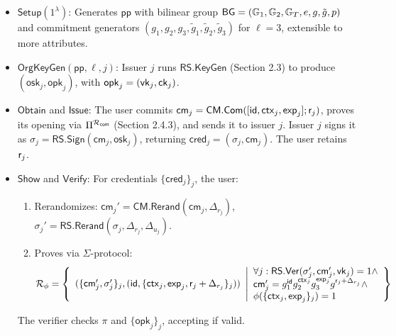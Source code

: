 \begin{itemize}
    \item $\mathsf{Setup}(1^\lambda)$: Generates $\mathsf{pp}$ with bilinear group $\mathsf{BG} = (\mathbb{G}_1, \mathbb{G}_2, \mathbb{G}_T, e, g, \tilde{g}, p)$ and commitment generators $(g_1, g_2, g_3, \tilde{g}_1, \tilde{g}_2, \tilde{g}_3)$ for $\ell = 3$, extensible to more attributes.
    
    \item $\mathsf{OrgKeyGen}(\mathsf{pp}, \ell, j)$: Issuer $j$ runs $\mathsf{RS.KeyGen}$ (Section 2.3) to produce $(\mathsf{osk}_j, \mathsf{opk}_j)$, with $\mathsf{opk}_j = (\mathsf{vk}_j, \mathsf{ck}_j)$.

    \item $\mathsf{Obtain}$ and $\mathsf{Issue}$: The user commits $\mathsf{cm}_j = \mathsf{CM.Com}([\mathsf{id}, \mathsf{ctx}_j, \mathsf{exp}_j]; \mathsf{r}_j)$, proves its opening via $\Pi^{\mathcal{R}_{\mathsf{com}}}$ (Section 2.4.3), and sends it to issuer $j$. Issuer $j$ signs it as $\sigma_j = \mathsf{RS.Sign}(\mathsf{cm}_j, \mathsf{osk}_j)$, returning $\mathsf{cred}_j = (\sigma_j, \mathsf{cm}_j)$. The user retains $\mathsf{r}_j$.

    \item $\mathsf{Show}$ and $\mathsf{Verify}$: For credentials $\{\mathsf{cred}_j\}_j$, the user:
        \begin{enumerate}
            \item Rerandomizes: $\mathsf{cm}_j' = \mathsf{CM.Rerand}(\mathsf{cm}_j, \Delta_{r_j})$, $\sigma_j' = \mathsf{RS.Rerand}(\sigma_j, \Delta_{r_j}, \Delta_{u_j})$.
            \item Proves via $\Sigma$-protocol:
                \[
                \mathcal{R}_\phi =\left\{ 
                \begin{array}{l} 
                (\{\mathsf{cm}_j', \sigma_j'\}_j, (\mathsf{id}, \{\mathsf{ctx}_j, \mathsf{exp}_j, \mathsf{r}_j + \Delta_{r_j}\}_j)) \\
                \end{array} 
                \middle|
                \begin{array}{l}
                \forall j: \mathsf{RS.Ver}(\sigma_j', \mathsf{cm}_j', \mathsf{vk}_j) = 1 \land \\
                \mathsf{cm}_j' = g_1^{\mathsf{id}} g_2^{\mathsf{ctx}_j} g_3^{\mathsf{exp}_j} g^{\mathsf{r}_j + \Delta_{r_j}} \land \\
                \phi(\{\mathsf{ctx}_j, \mathsf{exp}_j\}_j) = 1
                \end{array} 
                \right\}
                \]
        \end{enumerate}
        The verifier checks $\pi$ and $\{\mathsf{opk}_j\}_j$, accepting if valid.
\end{itemize}



